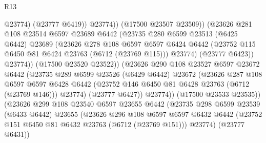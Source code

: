 \begin{lexlean}{R13}
\begin{coremodule}
                                  @23774)
                                (@23777 @6419))
                              @23774))
                          (@17500 @23507 @23509))
                        (@23626
                          @281
                          @108
                          @23514
                          @6597
                          @23689
                          @6442
                          (@23735
                            @280
                            @6599
                            @23513
                            (@6425 @6442)
                            @23689
                            (@23626
                              @278
                              @108
                              @6597
                              @6597
                              @6424
                              @6442
                              (@23752 @115 @6450 @81 @6424 @23763 (@6712 (@23769 @115)))
                              @23774)
                            (@23777 @6423))
                          @23774))
                      (@17500 @23520 @23522))
                    (@23626
                      @290
                      @108
                      @23527
                      @6597
                      @23672
                      @6442
                      (@23735
                        @289
                        @6599
                        @23526
                        (@6429 @6442)
                        @23672
                        (@23626
                          @287
                          @108
                          @6597
                          @6597
                          @6428
                          @6442
                          (@23752 @146 @6450 @81 @6428 @23763 (@6712 (@23769 @146)))
                          @23774)
                        (@23777 @6427))
                      @23774))
                  (@17500 @23533 @23535))
                (@23626
                  @299
                  @108
                  @23540
                  @6597
                  @23655
                  @6442
                  (@23735
                    @298
                    @6599
                    @23539
                    (@6433 @6442)
                    @23655
                    (@23626
                      @296
                      @108
                      @6597
                      @6597
                      @6432
                      @6442
                      (@23752 @151 @6450 @81 @6432 @23763 (@6712 (@23769 @151)))
                      @23774)
                    (@23777 @6431))

\end{coremodule}
\end{lexlean}
